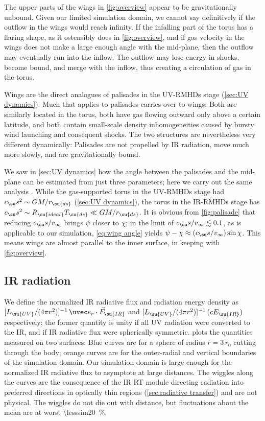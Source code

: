 \documentclass[twocolumn]{article}
\newcommand*\uvrmhd{\ac{UV}\protect\nobreakdash-\acp{RMHD}}
\newcommand*\irrmhd{\ac{IR}\protect\nobreakdash-\acp{RMHD}}
\begin{document}
The upper parts of the wings in \cref{fig:overview} appear to be
gravitationally unbound. Given our limited simulation domain, we cannot say
definitively if the outflow in the wings would reach infinity. If the infalling
part of the torus has a flaring shape, as it ostensibly does in
\cref{fig:overview}, and if gas velocity in the wings does not make a large
enough angle with the mid-plane, then the outflow may eventually run into the
inflow. The outflow may lose energy in shocks, become bound, and merge with the
inflow, thus creating a circulation of gas in the torus.

Wings are the direct analogues of palisades in the \uvrmhd{} stage
(\cref{sec:UV dynamics}). Much that applies to palisades carries over to wings:
Both are similarly located in the torus, both have gas flowing outward only
above a certain latitude, and both contain small-scale density inhomogeneities
caused by bursty wind launching and consequent shocks. The two structures are
nevertheless very different dynamically: Palisades are not propelled by \ac{IR}
radiation, move much more slowly, and are gravitationally bound.

We saw in \cref{sec:UV dynamics} how the angle between the palisades and the
mid-plane can be estimated from just three parameters; here we carry out the
same analysis . While the gas-supported torus in the
\uvrmhd{} stage had $c_\su s^2\sim GM/r_\su{ds}$ (\cref{sec:UV dynamics}), the
torus in the \irrmhd{} stage has $c_\su s^2\sim R_\su{ideal}T_\su{ds}\ll
GM/r_\su{ds}$. It is obvious from \cref{fig:palisade} that reducing $c_\su
s/v_\infty$ brings $\psi$ closer to $\chi$; in the limit of $c_\su
s/v_\infty\lesssim0.1$, as is applicable to our simulation, \cref{eq:wing
angle} yields $\psi-\chi\approx(c_\su s/v_\infty)\sin\chi$. This means wings
are almost parallel to the inner surface, in keeping with \cref{fig:overview}.

\subsection{\texorpdfstring{\acs*{IR}}{IR} radiation}
\label{sec:IR}

We define the normalized \ac{IR} radiative flux and radiation energy density as
$[L_\su{UV}/(4\pi r^2)]^{-1}\,\uvec e_r\cdot\vec F_\su{IR}$ and
$[L_\su{UV}/(4\pi r^2)]^{-1}\,(cE_\su{IR})$ respectively; the former quantity
is unity if all \ac{UV} radiation were converted to the \ac{IR}, and if \ac{IR}
radiative flux were spherically symmetric.  plots
the quantities measured on two surfaces: Blue curves are for a sphere of radius
$r=3\,r_0$ cutting through the body; orange curves are for the outer-radial and
vertical boundaries of the simulation domain. Our simulation domain is large
enough for the normalized \ac{IR} radiative flux to asymptote at large
distances. The wiggles along the curves are the consequence of the \ac{IR}
\ac{RT} module directing radiation into preferred directions in optically thin
regions (\cref{sec:radiative transfer}) and are not physical. The wiggles do
not die out with distance, but fluctuations about the mean are at worst
\SI{\lesssim20}{\percent}.
\end{document}
